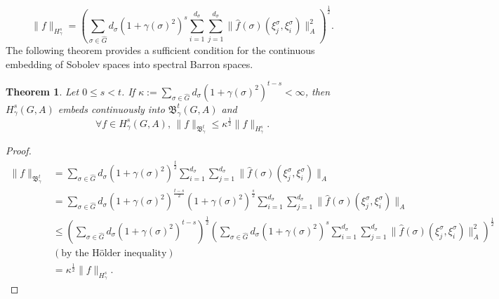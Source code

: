 \documentclass[12pt]{amsart}%
\newtheorem{theorem}{Theorem}[section]
\begin{document}
\begin{equation}
\|f\|_{H^s_\gamma}=\left(  \sum_{\sigma\in \widehat{G}}d_\sigma  (1+\gamma (\sigma)^2)^s\sum_{i=1}^{d_\sigma}\sum_{j=1}^{d_\sigma}\|\widehat{f}(\sigma)(\xi_j^\sigma, \xi_i^\sigma)\|_A^2 \right)^{\frac{1}{2}}. 
\end{equation}
The following theorem provides a sufficient condition for the continuous embedding of  Sobolev spaces into spectral Barron spaces. 
\begin{theorem} Let $0\leq s< t$. 
If $\kappa:=\sum\limits_{\sigma\in \widehat{G}}d_\sigma  (1+\gamma (\sigma)^2)^{t-s}<\infty$, then $H^s_\gamma (G,A)$ embeds continuously into $\mathfrak{B}^{t}_\gamma(G,A)$ and $$\forall f\in H^s_\gamma (G,A), \, \|f\|_{\mathfrak{B}^{t}_\gamma}\leq \kappa^{\frac{1}{2}}\|f\|_{H^{s}_\gamma}.$$
\end{theorem}
\begin{proof}
\begin{align*}
\|f\|_{\mathfrak{B}^{t}_\gamma}&=\sum_{\sigma\in \widehat{G}}d_\sigma  (1+\gamma (\sigma)^2)^{\frac{t}{2}}\sum_{i=1}^{d_\sigma}\sum_{j=1}^{d_\sigma}\|\widehat{f}(\sigma)(\xi_j^\sigma, \xi_i^\sigma)\|_A\\
&=\sum_{\sigma\in \widehat{G}}d_\sigma  (1+\gamma (\sigma)^2)^{\frac{t-s}{2}}(1+\gamma (\sigma)^2)^{\frac{s}{2}}\sum_{i=1}^{d_\sigma}\sum_{j=1}^{d_\sigma}\|\widehat{f}(\sigma)(\xi_j^\sigma, \xi_i^\sigma)\|_A\\
&\leq  \left(\sum_{\sigma\in \widehat{G}}d_\sigma  (1+\gamma (\sigma)^2)^{t-s}\right)^{\frac{1}{2}}\left(   \sum_{\sigma\in \widehat{G}}d_\sigma (1+\gamma (\sigma)^2)^{s}\sum_{i=1}^{d_\sigma}\sum_{j=1}^{d_\sigma}\|\widehat{f}(\sigma)(\xi_j^\sigma, \xi_i^\sigma)\|_A^2 \right)^{\frac{1}{2}}\\
&(\mbox{by the H\"older inequality})\\
&=\kappa^{\frac{1}{2}}\|f\|_{H^{s}_\gamma}.
\end{align*}
\end{proof}
\end{document}
